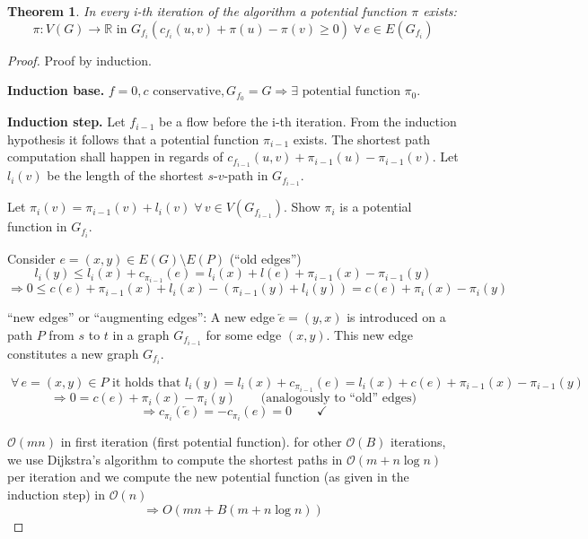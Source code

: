 \documentclass{article}
\newtheorem{theorem}{Theorem}
\newcommand{\gath}[2]{$#1$-$#2$-path} %
\newcommand{\fall}{\;\forall\,}
\begin{document}
\begin{theorem}
  In every i-th iteration of the algorithm a potential function $\pi$ exists:
  \[
    \pi: V(G) \rightarrow \mathbb{R} \text{ in } G_{f_i}(c_{f_i}(u,v) + \pi(u) - \pi(v) \geq 0)
    \fall e \in E(G_{f_i})
  \]
\end{theorem}

\begin{proof}
  Proof by induction.

  \textbf{Induction base.} $f=0, c \text{ conservative}, G_{f_0} = G \Rightarrow \exists \text{ potential function $\pi_0$}$.

  \textbf{Induction step.}
  Let $f_{i-1}$ be a flow before the i-th iteration. From the induction hypothesis it follows that a potential function $\pi_{i-1}$ exists. The shortest path computation shall happen in regards of
  $c_{f_{i-1}}(u,v) + \pi_{i-1}(u) - \pi_{i-1}(v)$. Let $l_i(v)$ be the length of the shortest \gath sv in $G_{f_{i-1}}$.

  Let $\pi_i(v) = \pi_{i-1}(v) + l_i(v) \fall v \in V(G_{f_{i-1}})$. Show $\pi_i$ is a potential function in $G_{f_i}$.

  Consider $e = (x, y) \in E(G) \setminus E(P)$ (``old edges'')
  \[
    l_i(y) \leq l_i(x) + c_{\pi_{i-1}}(e) = l_i(x) + l(e) + \pi_{i-1}(x) - \pi_{i-1}(y)
  \] \[
    \Rightarrow 0 \leq c(e) + \pi_{i-1}(x) + l_i(x) - \left(\pi_{i-1}(y) + l_i(y)\right)
      = c(e) + \pi_i(x) - \pi_i(y)
  \]

  ``new edges'' or ``augmenting edges'': A new edge $\overleftarrow{e} = (y, x)$ is introduced on a path $P$ from $s$ to $t$ in a graph $G_{f_{i-1}}$ for some edge $(x, y)$. This new edge constitutes a new graph $G_{f_i}$.

  \[
    \fall e = (x, y) \in P \text{ it holds that }
      l_i(y) = l_i(x) + c_{\pi_{i-1}}(e) = l_i(x) + c(e) + \pi_{i-1}(x) - \pi_{i-1}(y)
  \] \[
    \Rightarrow 0 = c(e) + \pi_i(x) - \pi_i(y) \qquad \text{(analogously to ``old'' edges)}
  \] \[
    \Rightarrow c_{\pi_i}(\overleftarrow{e}) = -c_{\pi_i}(e) = 0
      \qquad \checkmark
  \]

  $\mathcal{O}(mn)$ in first iteration (first potential function).
  for other $\mathcal{O}(B)$ iterations, we use Dijkstra's algorithm to compute the shortest paths in $\mathcal{O}(m + n \log{n})$ per iteration and we compute the new potential function (as given in the induction step) in $\mathcal{O}(n)$
  \[ \Rightarrow{O}(mn + B(m + n \log{n})) \]
\end{proof}
\end{document}
